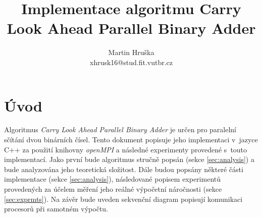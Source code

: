 \documentclass[a4paper, 12pt]{article}
\title{Implementace algoritmu Carry Look Ahead Parallel Binary Adder}
\author{Martin Hruška\\xhrusk16@stud.fit.vutbr.cz}
\date{}
\begin{document}
\maketitle

\section{Úvod}
\label{sec:intro}
Algoritmus \emph{Carry Look Ahead Parallel Binary Adder} je určen pro paralelní sčítání dvou binárních čísel.
Tento dokument popisuje jeho implementaci v~jazyce C++ za použití knihovny \emph{openMPI} a následné experimenty
provedené s~touto implementací.
Jako první bude algoritmus stručně popsán (sekce \ref{sec:analysis}) a bude analyzována jeho teoretická složitost.
Dále budou popsány některé části implementace (sekce \ref{sec:analysis}), následované popisem experimentů
provedených za účelem měření jeho reálné výpočetní náročnosti (sekce \ref{sec:exprmts}).
Na závěr bude uveden sekvenční diagram popisují komunikaci procesorů při samotném výpočtu.
\end{document}
